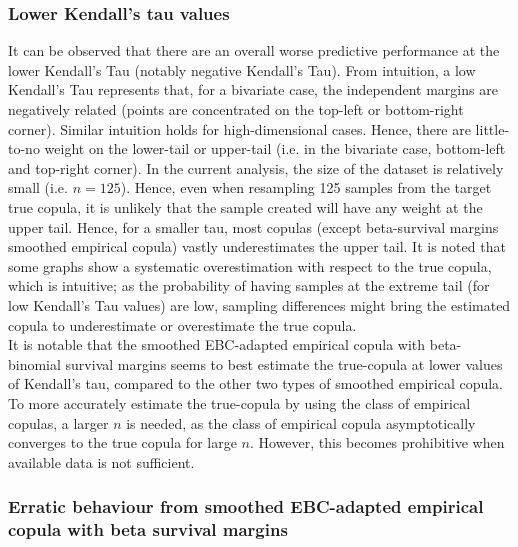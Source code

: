 \documentclass[12pt]{report}
\newcommand{\1}{\mathbf{1}}
\begin{document}
\begin{flushleft}
\subsubsection{Lower Kendall's tau values}
\vspace{0.5cm}
It can be observed that there are an overall worse predictive performance at the lower Kendall's Tau (notably negative Kendall's Tau). From intuition, a low Kendall's Tau represents that, for a bivariate case, the independent margins are negatively related (points are concentrated on the top-left or bottom-right corner). Similar intuition holds for high-dimensional cases. Hence, there are little-to-no weight on the lower-tail or upper-tail (i.e. in the bivariate case, bottom-left and top-right corner). In the current analysis, the size of the dataset is relatively small (i.e. $n = 125$). Hence, even when resampling 125 samples from the target true copula, it is unlikely that the sample created will have any weight at the upper tail. Hence, for a smaller tau, most copulas (except beta-survival margins smoothed empirical copula) vastly underestimates the upper tail. It is noted that some graphs show a systematic overestimation with respect to the true copula, which is intuitive; as the probability of having samples at the extreme tail (for low Kendall's Tau values) are low, sampling differences might bring the estimated copula to underestimate or overestimate the true copula.\\
\vspace{0.5cm}
It is notable that the smoothed EBC-adapted empirical copula with beta-binomial survival margins seems to best estimate the true-copula at lower values of Kendall's tau, compared to the other two types of smoothed empirical copula. \\
\vspace{0.5cm}
To more accurately estimate the true-copula by using the class of empirical copulas, a larger $n$ is needed, as the class of empirical copula asymptotically converges to the true copula for large $n$. However, this becomes prohibitive when available data is not sufficient. 

\pagebreak
\subsubsection{Erratic behaviour from smoothed EBC-adapted empirical copula with beta survival margins}


\end{flushleft}
\end{document}

